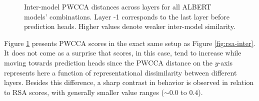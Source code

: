 \documentclass[a4paper, nobind]{templates/ociamthesis}
\begin{document}
\begin{figure}

{\centering {}\newline{}

}

\caption{Inter-model PWCCA distances across layers for all ALBERT models' combinations. Layer -1 corresponds to the last layer before prediction heads. Higher values denote weaker inter-model similarity.}\label{fig:pwcca-inter}
\end{figure}

Figure \ref{fig:pwcca-inter} presents PWCCA scores in the exact same setup as Figure \ref{fig:rsa-inter}. It does not come as a surprise that scores, in this case, tend to increase while moving towards prediction heads since the PWCCA distance on the \(y\)-axis represents here a function of representational dissimilarity between different layers. Besides this difference, a sharp contrast in behavior is observed in relation to RSA scores, with generally smaller value ranges (\(\sim 0.0\) to \(0.4\)).
\end{document}
